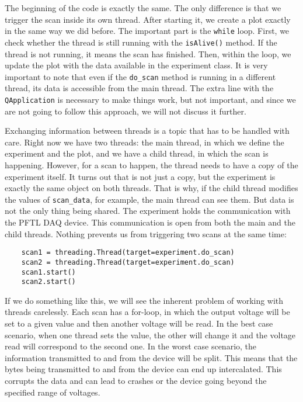 The beginning of the code is exactly the same. The only difference is that we trigger the scan inside its own thread. After starting it, we create a plot exactly in the same way we did before. The important part is the \texttt{while} loop. First, we check whether the thread is still running with the \texttt{isAlive()} method. If the thread is not running, it means the scan has finished. Then, within the loop, we update the plot with the data available in the experiment class. It is very important to note that even if the \texttt{do\_scan} method is running in a different thread, its data is accessible from the main thread. The extra line with the \texttt{QApplication} is necessary to make things work, but not important, and since we are not going to follow this approach, we will not discuss it further.

Exchanging information between threads is a topic that has to be handled with care. Right now we have two threads: the main thread, in which we define the experiment and the plot, and we have a child thread, in which the scan is happening. However, for a scan to happen, the thread needs to have a copy of the experiment itself. It turns out that is not just a copy, but the experiment is exactly the same object on both threads. That is why, if the child thread modifies the values of \texttt{scan\_data}, for example, the main thread can see them. But data is not the only thing being shared. The experiment holds the communication with the {PFTL DAQ} device. This communication is open from both the main and the child threads. Nothing prevents us from triggering two scans at the same time:

\begin{verbatim}
    scan1 = threading.Thread(target=experiment.do_scan)
    scan2 = threading.Thread(target=experiment.do_scan)
    scan1.start()
    scan2.start()
\end{verbatim}

If we do something like this, we will see the inherent problem of working with threads carelessly. Each scan has a for-loop, in which the output voltage will be set to a given value and then another voltage will be read. In the best case scenario, when one thread sets the value, the other will change it and the voltage read will correspond to the second one. In the worst case scenario, the information transmitted to and from the device will be split. This means that the bytes being transmitted to and from the device can end up intercalated. This corrupts the data and can lead to crashes or the device going beyond the specified range of voltages.

